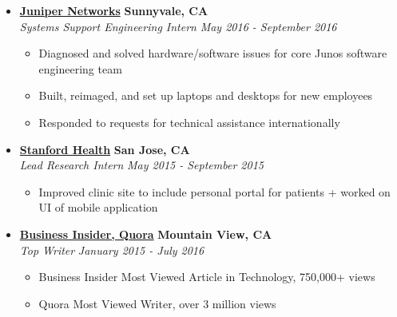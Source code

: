 \documentclass[10pt,letterpaper]{article}
\begin{document}
\begin{itemize}
    \item[]
    {\href{https://www.juniper.net/us/en/}{\textbf{Juniper Networks}} \hfill
      \textbf{Sunnyvale, CA}}
    \\
    {\emph{Systems Support Engineering Intern} \hfill \emph{May 2016 - September 2016}}

    \begin{itemize}[label=\textbullet]
      \itemsep0em
      \item Diagnosed and solved hardware/software issues for core Junos software engineering team
      \item Built, reimaged, and set up laptops and desktops for new employees
      \item Responded to requests for technical assistance internationally
    \end{itemize}

    \item[]
    {\href{https://stanfordhealthcare.org/}{\textbf{Stanford Health}} \hfill
      \textbf{San Jose, CA}}
    \\
    {\emph{Lead Research Intern} \hfill \emph{May 2015 - September 2015}}

    \begin{itemize}[label=\textbullet]
      \itemsep0em
      \item Improved clinic site to include personal portal for patients + worked on UI of mobile application
    \end{itemize}


    \item[]
    {\href{http://www.businessinsider.com/}{\textbf{Business Insider, Quora}} \hfill
      \textbf{Mountain View, CA}}
    \\
    {\emph{Top Writer} \hfill \emph{January 2015 - July 2016}}

    \begin{itemize}[label=\textbullet]
      \itemsep0em
      \item Business Insider Most Viewed Article in Technology, 750,000+ views
      \item Quora Most Viewed Writer, over 3 million views
    \end{itemize}
  \end{itemize}


\end{document}
